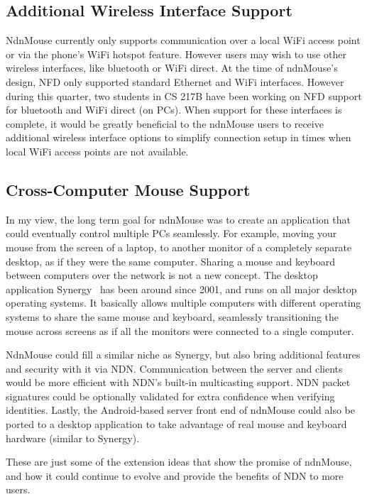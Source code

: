 \documentclass{sig-alternate}
\renewcommand\_{\textunderscore\allowbreak}  %
\begin{document}
\subsection{Additional Wireless Interface Support}
NdnMouse currently only supports communication over a local WiFi access point or via the phone's WiFi hotspot feature. However users may wish to use other wireless interfaces, like bluetooth or WiFi direct. At the time of ndnMouse's design, NFD only supported standard Ethernet and WiFi interfaces. However during this quarter, two students in CS 217B have been working on NFD support for bluetooth and WiFi direct (on PCs). When support for these interfaces is complete, it would be greatly beneficial to the ndnMouse users to receive additional wireless interface options to simplify connection setup in times when local WiFi access points are not available.

\subsection{Cross-Computer Mouse Support}
In my view, the long term goal for ndnMouse was to create an application that could eventually control multiple PCs seamlessly. For example, moving your mouse from the screen of a laptop, to another monitor of a completely separate desktop, as if they were the same computer. Sharing a mouse and keyboard between computers over the network is not a new concept. The desktop application Synergy~\cite{synergy} has been around since 2001, and runs on all major desktop operating systems. It basically allows multiple computers with different operating systems to share the same mouse and keyboard, seamlessly transitioning the mouse across screens as if all the monitors were connected to a single computer.

NdnMouse could fill a similar niche as Synergy, but also bring additional features and security with it via NDN. Communication between the server and clients would be more efficient with NDN's built-in multicasting support. NDN packet signatures could be optionally validated for extra confidence when verifying identities. Lastly, the Android-based server front end of ndnMouse could also be ported to a desktop application to take advantage of real mouse and keyboard hardware (similar to Synergy).

These are just some of the extension ideas that show the promise of ndnMouse, and how it could continue to evolve and provide the benefits of NDN to more users.
\end{document}
